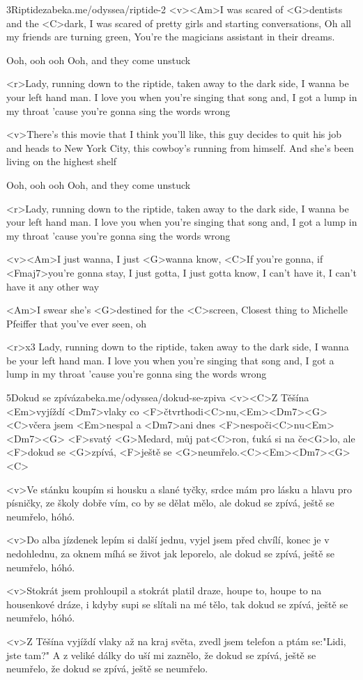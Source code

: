 \begin{song}{3}{Riptide}{zabeka.me/odyssea/riptide-2}
	<v><Am>I was scared of <G>dentists and the <C>dark,
	I was scared of pretty girls and starting conversations,
	Oh all my friends are turning green,
	You're the magicians assistant in their dreams.

	Ooh, ooh ooh
	Ooh, and they come unstuck

	<r>Lady, running down to the riptide,
	taken away to the dark side,
	I wanna be your left hand man.
	I love you when you're singing that song and,
	I got a lump in my throat 'cause
	you're gonna sing the words wrong

	<v>There's this movie that I think you'll like,
	this guy decides to quit his job and heads to New York City,
	this cowboy's running from himself.
	And she's been living on the highest shelf

	Ooh, ooh ooh
	Ooh, and they come unstuck

	<r>Lady, running down to the riptide,
	taken away to the dark side,
	I wanna be your left hand man.
	I love you when you're singing that song and,
	I got a lump in my throat 'cause
	you're gonna sing the words wrong

	<v><Am>I just wanna, I just <G>wanna know,
	<C>If you're gonna, if <Fmaj7>you're gonna stay,
	I just gotta, I just gotta know,
	I can't have it, I can't have it any other way

	<Am>I swear she's <G>destined for the <C>screen,
	Closest thing to Michelle Pfeiffer that you've ever seen, oh

	<r>x3
	Lady, running down to the riptide,
	taken away to the dark side,
	I wanna be your left hand man.
	I love you when you're singing that song and,
	I got a lump in my throat 'cause
	you're gonna sing the words wrong
\end{song}
\begin{song}{5}{Dokud se zpívá}{zabeka.me/odyssea/dokud-se-zpiva}
	<v><C>Z Těšína <Em>vyjíždí <Dm7>vlaky co <F>čtvrthodi<C>nu,<Em><Dm7><G>
	<C>včera jsem <Em>nespal a <Dm7>ani dnes <F>nespoči<C>nu<Em><Dm7><G>
	<F>svatý <G>Medard, můj pat<C>ron, ťuká si na če<G>lo,
	ale <F>dokud se <G>zpívá, <F>ještě se <G>neumřelo.<C><Em><Dm7><G><C>

	<v>Ve stánku koupím si housku a slané tyčky,
	srdce mám pro lásku a hlavu pro písničky,
	ze školy dobře vím, co by se dělat mělo,
	ale dokud se zpívá, ještě se neumřelo, hóhó.


	<v>Do alba jízdenek lepím si další jednu,
	vyjel jsem před chvílí, konec je v nedohlednu,
	za oknem míhá se život jak leporelo,
	ale dokud se zpívá, ještě se neumřelo, hóhó.


	<v>Stokrát jsem prohloupil a stokrát platil draze,
	houpe to, houpe to na housenkové dráze,
	i kdyby supi se slítali na mé tělo,
	tak dokud se zpívá, ještě se neumřelo, hóhó.

	<v>Z Těšína vyjíždí vlaky až na kraj světa,
	zvedl jsem telefon a ptám se:"Lidi, jste tam?"
	A z veliké dálky do uší mi zaznělo,
	že dokud se zpívá, ještě se neumřelo,
	že dokud se zpívá, ještě se neumřelo.
\end{song}
